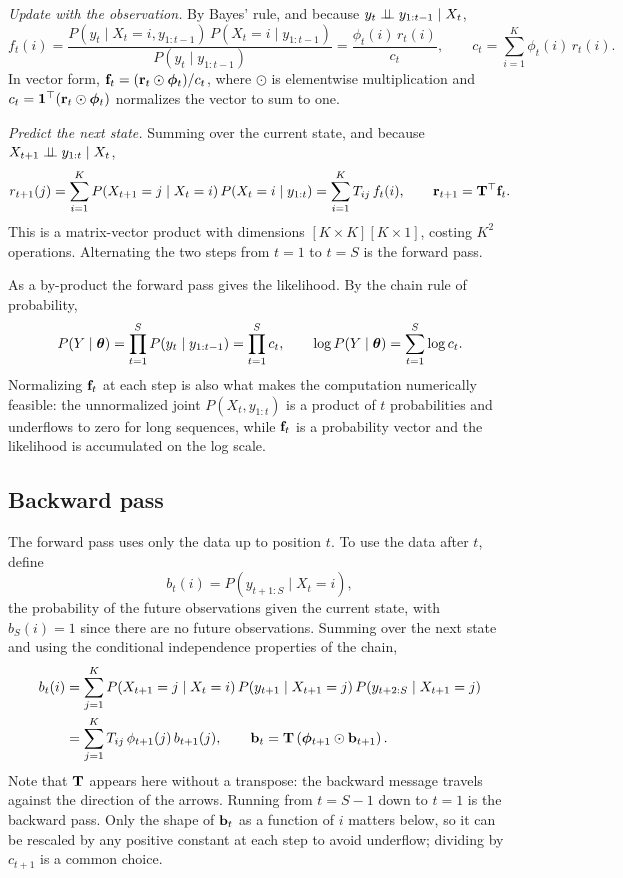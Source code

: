 \emph{Update with the observation.} By Bayes' rule, and because $y_t\perp\!\!\!\perp y_{1:t-1}\mid X_t$,
\begin{equation}
  f_t(i) = \frac{P(y_t\mid X_t=i, y_{1:t-1})\,P(X_t=i\mid y_{1:t-1})}{P(y_t\mid y_{1:t-1})} = \frac{\phi_t(i)\,r_t(i)}{c_t},
  \qquad c_t = \sum_{i=1}^K\phi_t(i)\,r_t(i).
\end{equation}
In vector form, $\mathbf{f}_t=(\mathbf{r}_t\odot\boldsymbol{\phi}_t)/c_t$, where $\odot$ is elementwise multiplication and $c_t=\mathbf{1}^\top(\mathbf{r}_t\odot\boldsymbol{\phi}_t)$ normalizes the vector to sum to one.

\emph{Predict the next state.} Summing over the current state, and because $X_{t+1}\perp\!\!\!\perp y_{1:t}\mid X_t$,
\begin{equation}
  r_{t+1}(j) = \sum_{i=1}^K P(X_{t+1}=j\mid X_t=i)\,P(X_t=i\mid y_{1:t}) = \sum_{i=1}^K T_{ij}\,f_t(i),
  \qquad \mathbf{r}_{t+1} = \mathbf{T}^\top\mathbf{f}_t .
\end{equation}
This is a matrix-vector product with dimensions $[K\times K][K\times 1]$, costing $K^2$ operations. Alternating the two steps from $t=1$ to $t=S$ is the forward pass.

As a by-product the forward pass gives the likelihood. By the chain rule of probability,
\begin{equation}
  P(Y\mid\boldsymbol{\theta}) = \prod_{t=1}^S P(y_t\mid y_{1:t-1}) = \prod_{t=1}^S c_t,
  \qquad \log P(Y\mid\boldsymbol{\theta}) = \sum_{t=1}^S\log c_t .
  \label{eq:hmm_loglik}
\end{equation}
Normalizing $\mathbf{f}_t$ at each step is also what makes the computation numerically feasible: the unnormalized joint $P(X_t,y_{1:t})$ is a product of $t$ probabilities and underflows to zero for long sequences, while $\mathbf{f}_t$ is a probability vector and the likelihood is accumulated on the log scale.

\subsection{Backward pass}

The forward pass uses only the data up to position $t$. To use the data after $t$, define
\begin{equation}
  b_t(i) = P(y_{t+1:S}\mid X_t=i),
\end{equation}
the probability of the future observations given the current state, with $b_S(i)=1$ since there are no future observations. Summing over the next state and using the conditional independence properties of the chain,
\begin{align}
  b_t(i) &= \sum_{j=1}^K P(X_{t+1}=j\mid X_t=i)\,P(y_{t+1}\mid X_{t+1}=j)\,P(y_{t+2:S}\mid X_{t+1}=j) \nonumber\\
  &= \sum_{j=1}^K T_{ij}\,\phi_{t+1}(j)\,b_{t+1}(j),
  \qquad \mathbf{b}_t = \mathbf{T}\left(\boldsymbol{\phi}_{t+1}\odot\mathbf{b}_{t+1}\right).
\end{align}
Note that $\mathbf{T}$ appears here without a transpose: the backward message travels against the direction of the arrows. Running from $t=S-1$ down to $t=1$ is the backward pass. Only the shape of $\mathbf{b}_t$ as a function of $i$ matters below, so it can be rescaled by any positive constant at each step to avoid underflow; dividing by $c_{t+1}$ is a common choice.

